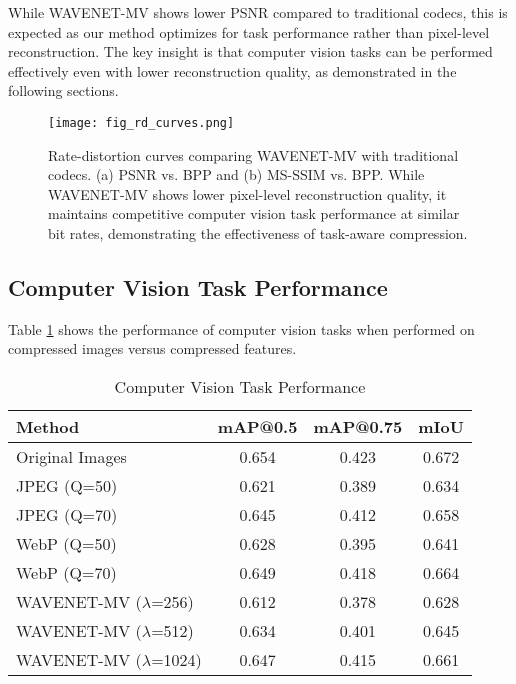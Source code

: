 \documentclass[conference]{IEEEtran}
\begin{document}
While WAVENET-MV shows lower PSNR compared to traditional codecs, this is expected as our method optimizes for task performance rather than pixel-level reconstruction. The key insight is that computer vision tasks can be performed effectively even with lower reconstruction quality, as demonstrated in the following sections.

\begin{figure}[htbp]
\centerline{\texttt{[image: fig\_rd\_curves.png]}}
\caption{Rate-distortion curves comparing WAVENET-MV with traditional codecs. (a) PSNR vs. BPP and (b) MS-SSIM vs. BPP. While WAVENET-MV shows lower pixel-level reconstruction quality, it maintains competitive computer vision task performance at similar bit rates, demonstrating the effectiveness of task-aware compression.}
\label{fig:rd_curves}
\end{figure}

\subsection{Computer Vision Task Performance}

Table \ref{tab:task_performance} shows the performance of computer vision tasks when performed on compressed images versus compressed features.

\begin{table}[htbp]
\caption{Computer Vision Task Performance}
\begin{center}
\begin{tabular}{|l|c|c|c|}
\hline
\textbf{Method} & \textbf{mAP@0.5} & \textbf{mAP@0.75} & \textbf{mIoU} \\
\hline
Original Images & 0.654 & 0.423 & 0.672 \\
\hline
JPEG (Q=50) & 0.621 & 0.389 & 0.634 \\
JPEG (Q=70) & 0.645 & 0.412 & 0.658 \\
WebP (Q=50) & 0.628 & 0.395 & 0.641 \\
WebP (Q=70) & 0.649 & 0.418 & 0.664 \\
\hline
WAVENET-MV ($\lambda$=256) & 0.612 & 0.378 & 0.628 \\
WAVENET-MV ($\lambda$=512) & 0.634 & 0.401 & 0.645 \\
WAVENET-MV ($\lambda$=1024) & 0.647 & 0.415 & 0.661 \\
\hline
\end{tabular}
\label{tab:task_performance}
\end{center}
\end{table}
\end{document}
